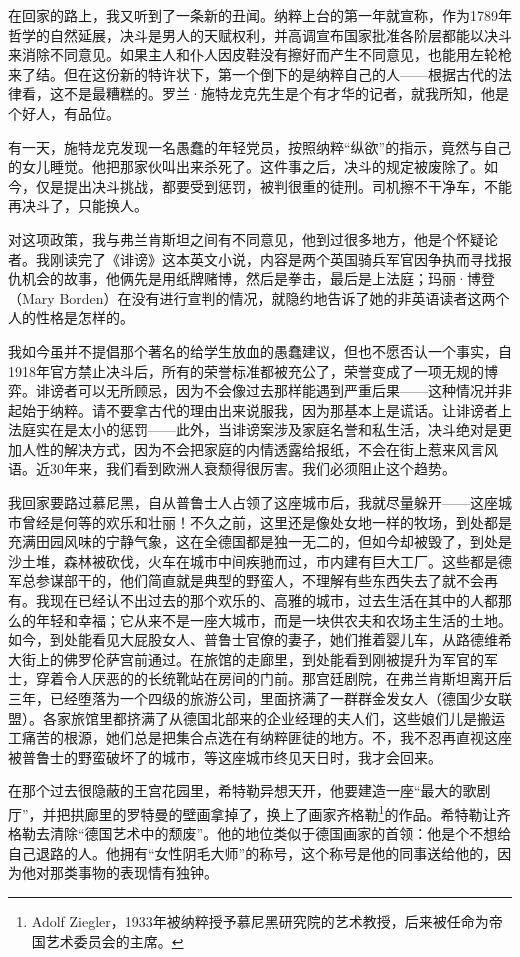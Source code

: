 \documentclass[UTF8]{ctexart}
\begin{document}
在回家的路上，我又听到了一条新的丑闻。纳粹上台的第一年就宣称，作为1789年哲学的自然延展，决斗是男人的天赋权利，并高调宣布国家批准各阶层都能以决斗来消除不同意见。如果主人和仆人因皮鞋没有擦好而产生不同意见，也能用左轮枪来了结。但在这份新的特许状下，第一个倒下的是纳粹自己的人——根据古代的法律看，这不是最糟糕的。罗兰·施特龙克先生是个有才华的记者，就我所知，他是个好人，有品位。

有一天，施特龙克发现一名愚蠢的年轻党员，按照纳粹“纵欲”的指示，竟然与自己的女儿睡觉。他把那家伙叫出来杀死了。这件事之后，决斗的规定被废除了。如今，仅是提出决斗挑战，都要受到惩罚，被判很重的徒刑。司机擦不干净车，不能再决斗了，只能换人。

对这项政策，我与弗兰肯斯坦之间有不同意见，他到过很多地方，他是个怀疑论者。我刚读完了《诽谤》这本英文小说，内容是两个英国骑兵军官因争执而寻找报仇机会的故事，他俩先是用纸牌赌博，然后是拳击，最后是上法庭；玛丽·博登（Mary Borden）在没有进行宣判的情况，就隐约地告诉了她的非英语读者这两个人的性格是怎样的。

我如今虽并不提倡那个著名的给学生放血的愚蠢建议，但也不愿否认一个事实，自1918年官方禁止决斗后，所有的荣誉标准都被充公了，荣誉变成了一项无规的博弈。诽谤者可以无所顾忌，因为不会像过去那样能遇到严重后果——这种情况并非起始于纳粹。请不要拿古代的理由出来说服我，因为那基本上是谎话。让诽谤者上法庭实在是太小的惩罚——此外，当诽谤案涉及家庭名誉和私生活，决斗绝对是更加人性的解决方式，因为不会把家庭的内情透露给报纸，不会在街上惹来风言风语。近30年来，我们看到欧洲人衰颓得很厉害。我们必须阻止这个趋势。

我回家要路过慕尼黑，自从普鲁士人占领了这座城市后，我就尽量躲开——这座城市曾经是何等的欢乐和壮丽！不久之前，这里还是像处女地一样的牧场，到处都是充满田园风味的宁静气象，这在全德国都是独一无二的，但如今却被毁了，到处是沙土堆，森林被砍伐，火车在城市中间疾驰而过，市内建有巨大工厂。这些都是德军总参谋部干的，他们简直就是典型的野蛮人，不理解有些东西失去了就不会再有。我现在已经认不出过去的那个欢乐的、高雅的城市，过去生活在其中的人都那么的年轻和幸福；它从来不是一座大城市，而是一块供农夫和农场主生活的土地。如今，到处能看见大屁股女人、普鲁士官僚的妻子，她们推着婴儿车，从路德维希大街上的佛罗伦萨宫前通过。在旅馆的走廊里，到处能看到刚被提升为军官的军士，穿着令人厌恶的的长统靴站在房间的门前。那宫廷剧院，在弗兰肯斯坦离开后三年，已经堕落为一个四级的旅游公司，里面挤满了一群群金发女人（德国少女联盟）。各家旅馆里都挤满了从德国北部来的企业经理的夫人们，这些娘们儿是搬运工痛苦的根源，她们总是把集合点选在有纳粹匪徒的地方。不，我不忍再直视这座被普鲁士的野蛮破坏了的城市，等这座城市终见天日时，我才会回来。

在那个过去很隐蔽的王宫花园里，希特勒异想天开，他要建造一座“最大的歌剧厅”，并把拱廊里的罗特曼的壁画拿掉了，换上了画家齐格勒\footnote{Adolf Ziegler，1933年被纳粹授予慕尼黑研究院的艺术教授，后来被任命为帝国艺术委员会的主席。}的作品。希特勒让齐格勒去清除“德国艺术中的颓废”。他的地位类似于德国画家的首领：他是个不想给自己退路的人。他拥有“女性阴毛大师”的称号，这个称号是他的同事送给他的，因为他对那类事物的表现情有独钟。
\end{document}

